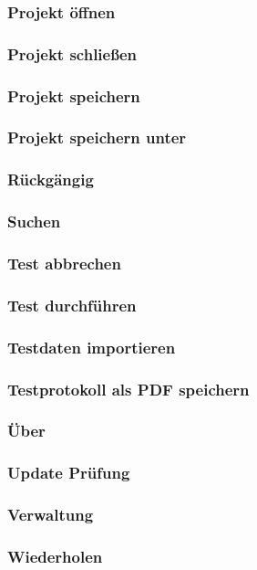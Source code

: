 \documentclass[a4paper,10pt]{scrartcl}
\begin{document}
\subsubsection{Projekt öffnen}
\subsubsection{Projekt schließen}
\subsubsection{Projekt speichern}
\subsubsection{Projekt speichern unter}
\subsubsection{Rückgängig}
\subsubsection{Suchen}
\subsubsection{Test abbrechen}
\subsubsection{Test durchführen}
\subsubsection{Testdaten importieren}
\subsubsection{Testprotokoll als PDF speichern}
\subsubsection{Über}
\subsubsection{Update Prüfung}
\subsubsection{Verwaltung}
\subsubsection{Wiederholen}
\end{document}
